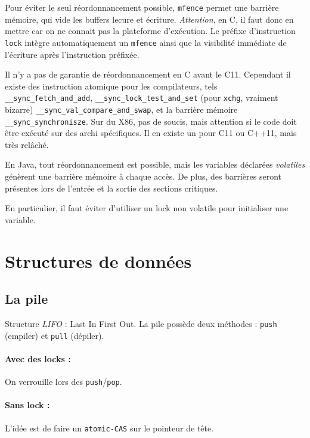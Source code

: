 \documentclass{article}
\begin{document}
Pour éviter le seul réordonnancement possible, \texttt{mfence} permet une barrière mémoire, qui vide les buffers lecure et écriture. \emph{Attention}, en C, il faut donc en mettre car on ne connait pas la plateforme d'exécution. Le préfixe d'instruction \texttt{lock} intègre automatiquement un \texttt{mfence} ainsi que la visibilité immédiate de l'écriture après l'instruction préfixée.
\bigskip


Il n'y a pas de garantie de réordonnancement en C avant le C11. Cependant il existe des instruction atomique pour les compilateurs, tels \texttt{\_\_sync\_fetch\_and\_add}, \texttt{\_\_sync\_lock\_test\_and\_set} (pour \texttt{xchg}, vraiment bizarre) \texttt{\_\_sync\_val\_compare\_and\_swap}, et la barrière mémoire \texttt{\_\_sync\_synchronisze}. Sur du X86, pas de soucis, mais attention si le code doit être exécuté sur des archi spécifiques. Il en existe un pour C11 ou C++11, mais très relâché.
\bigskip


En Java, tout réordonnancement est possible, mais les variables déclarées \emph{volatiles} génèrent une barrière mémoire à chaque accès. De plus, des barrières seront présentes lors de l'entrée et la sortie des sections critiques.
\bigskip

En particulier, il faut éviter d'utiliser un lock non volatile pour initialiser une variable.

\section{Structures de données}
\subsection{La pile}
Structure \emph{LIFO} : Last In First Out. La pile possède deux méthodes : \texttt{push} (empiler) et \texttt{pull} (dépiler).

\paragraph{Avec des locks :} On verrouille lors des \texttt{push}/\texttt{pop}.

\paragraph{Sans lock :} L'idée est de faire un \texttt{atomic-CAS} sur le pointeur de tête.

\begin{algorithm}[H]
\end{algorithm}
\end{document}
